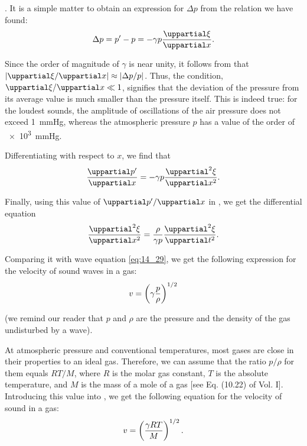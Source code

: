 .
It is a simple matter to obtain an expression for $\Delta{p}$ from the relation we have found:
\begin{equation}\label{eq:14_68}
	\Delta{p} = p' - p = - \gamma p \diffpartial{\xi}{x}.
\end{equation}

Since the order of magnitude of $\gamma$ is near unity, it follows from  that $|\diffpartialin{\xi}{x}| \approx |\Delta{p}/p|$.
Thus, the condition, $\diffpartialin{\xi}{x}\ll 1$, signifies that the deviation of the pressure from its average value is much smaller than the pressure itself.
This is indeed true: for the loudest sounds, the amplitude of oscillations of the air pressure does not exceed \SI{1}{\mmHg}, whereas the atmospheric pressure $p$ has a value of the order of \SI{e3}{\mmHg}.

Differentiating  with respect to $x$, we find that
\begin{equation*}
	\diffpartial{p'}{x} = - \gamma p \diffnpartial{\xi}{x}{2}.
\end{equation*}

\noindent
Finally, using this value of $\diffpartialin{p'}{x}$ in , we get the differential equation
\begin{equation*}
	\diffnpartial{\xi}{x}{2} = \frac{\rho}{\gamma p} \diffnpartial{\xi}{t}{2}.
\end{equation*}

\noindent
Comparing it with wave equation \eqref{eq:14_29}, we get the following expression for the velocity of sound waves in a gas:
\begin{equation}\label{eq:14_69}
	v = \left(\gamma \frac{p}{\rho}\right)^{1/2}
\end{equation}

\noindent
(we remind our reader that $p$ and $\rho$ are the pressure and the density of the gas undisturbed by a wave).

At atmospheric pressure and conventional temperatures, most gases are close in their properties to an ideal gas.
Therefore, we can assume that the ratio $p/\rho$ for them equals $RT/M$, where $R$ is the molar gas constant, $T$ is the absolute temperature, and $M$ is the mass of a mole of a gas [see Eq. (10.22) of Vol. I].
Introducing this value into , we get the following equation for the velocity of sound in a gas:
\begin{equation}\label{eq:14_70}
	v = \left( \frac{\gamma RT}{M}\right)^{1/2}.
\end{equation}

